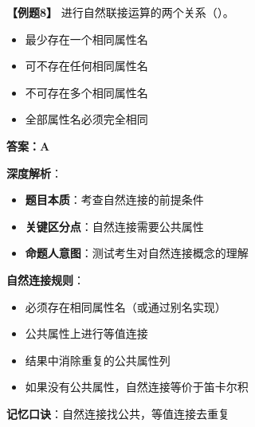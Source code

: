 \documentclass[12pt, a4paper]{article}
\newenvironment{bluebox}[1]{%
  \begin{trivlist}
  \item[\hskip\labelsep \textbf{#1}]
  \setlength{\parskip}{0.5ex}
  \setlength{\itemsep}{0.5ex}
}{%
  \end{trivlist}
}
\begin{document}
\begin{bluebox}{例题8：自然连接条件}
	\textbf{【例题8】} 进行自然联接运算的两个关系（\quad）。

	\begin{itemize}
		\item[A)] 最少存在一个相同属性名
		\item[B)] 可不存在任何相同属性名
		\item[C)] 不可存在多个相同属性名
		\item[D)] 全部属性名必须完全相同
	\end{itemize}

	\textbf{答案：A}

	\textbf{深度解析}：

	\begin{itemize}
		\item \textbf{题目本质}：考查自然连接的前提条件
		\item \textbf{关键区分点}：自然连接需要公共属性
		\item \textbf{命题人意图}：测试考生对自然连接概念的理解
	\end{itemize}

	\textbf{自然连接规则}：

	\begin{itemize}
		\item 必须存在相同属性名（或通过别名实现）
		\item 公共属性上进行等值连接
		\item 结果中消除重复的公共属性列
		\item 如果没有公共属性，自然连接等价于笛卡尔积
	\end{itemize}

	\textbf{记忆口诀}：自然连接找公共，等值连接去重复
\end{bluebox}
\end{document}
